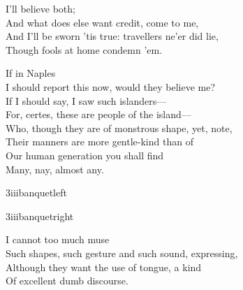 \begin{verse_speech}[Antonio] 
I'll believe both;\\
And what does else want credit, come to me,\\
And I'll be sworn 'tis true: travellers ne'er did lie,\\
Though fools at home condemn 'em.
\end{verse_speech}

\begin{verse_speech}[Gonzalo] 
If in Naples\\
I should report this now, would they believe me?\\
If I should say, I saw such islanders—\\
For, certes, these are people of the island—\\
Who, though they are of monstrous shape, yet, note,\\
Their manners are more gentle-kind than of\\
Our human generation you shall find\\
Many, nay, almost any.
\end{verse_speech}

\begin{letter}
	\begin{bwbigpic}
		[\picwidth]
		{3iiibanquetleft}
		{}
	\end{bwbigpic}
	\begin{bwbigpic}
		[\picwidth]
		{3iiibanquetright}
		{}
	\end{bwbigpic}
\end{letter}


\begin{verse_speech}[Prospero]
\end{verse_speech}


\begin{verse_speech}[Alonso] 
I cannot too much muse\\
Such shapes, such gesture and such sound, expressing,\\
Although they want the use of tongue, a kind\\
Of excellent dumb discourse.
\end{verse_speech}

